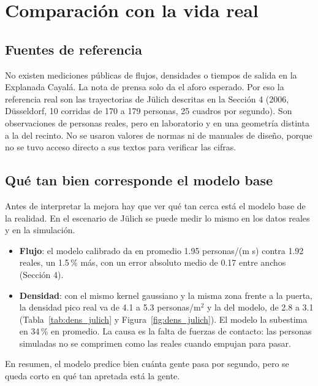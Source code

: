 \documentclass[11pt,letterpaper]{article}
\begin{document}
\section{Comparación con la vida real}
\label{sec:real}

\subsection{Fuentes de referencia}
No existen mediciones públicas de flujos, densidades o tiempos de salida en la Explanada Cayalá. La nota de prensa solo da el aforo esperado. Por eso la referencia real son las trayectorias de Jülich descritas en la Sección 4 (2006, Düsseldorf, 10 corridas de 170 a 179 personas, 25 cuadros por segundo). Son observaciones de personas reales, pero en laboratorio y en una geometría distinta a la del recinto. No se usaron valores de normas ni de manuales de diseño, porque no se tuvo acceso directo a sus textos para verificar las cifras.

\subsection{Qué tan bien corresponde el modelo base}
Antes de interpretar la mejora hay que ver qué tan cerca está el modelo base de la realidad. En el escenario de Jülich se puede medir lo mismo en los datos reales y en la simulación.
\begin{itemize}
\item \textbf{Flujo}: el modelo calibrado da en promedio 1.95 personas/(m s) contra 1.92 reales, un 1.5\,\% más, con un error absoluto medio de 0.17 entre anchos (Sección 4).
\item \textbf{Densidad}: con el mismo kernel gaussiano y la misma zona frente a la puerta, la densidad pico real va de 4.1 a 5.3 personas/m$^2$ y la del modelo, de 2.8 a 3.1 (Tabla~\ref{tab:dens_julich} y Figura~\ref{fig:dens_julich}). El modelo la subestima en 34\,\% en promedio. La causa es la falta de fuerzas de contacto: las personas simuladas no se comprimen como las reales cuando empujan para pasar.
\end{itemize}
En resumen, el modelo predice bien cuánta gente pasa por segundo, pero se queda corto en qué tan apretada está la gente.

\begin{table}[H]
\centering
\caption{Densidad pico frente a la entrada del cuello de botella, real y simulada (5 semillas), medida con kernel gaussiano de $\sigma = 0.7$ m en la zona de 4 por 1.5 m que cubre la cámara.}
\label{tab:dens_julich}

\end{table}
\end{document}
